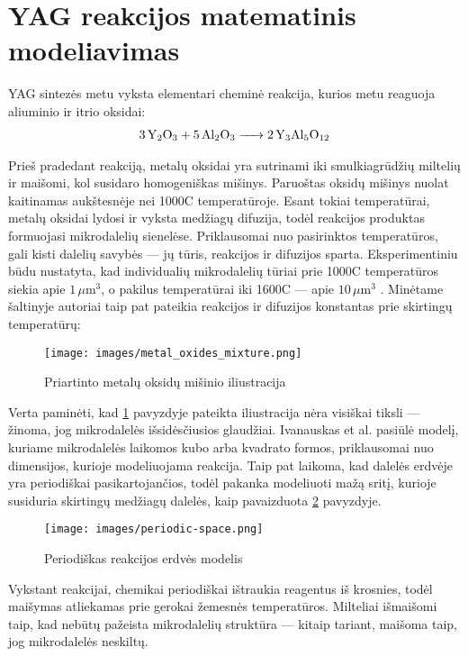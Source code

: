 \section{YAG reakcijos matematinis modeliavimas}

YAG sintezės metu vyksta elementari cheminė reakcija, kurios metu reaguoja aliuminio ir itrio oksidai:
\begin{align*}
  \ce{3Y_2O_3 + 5Al_2O_3 -> 2Y_3Al_5O_12}
\end{align*}

Prieš pradedant reakciją, metalų oksidai yra sutrinami iki smulkiagrūdžių miltelių ir maišomi, kol susidaro homogeniškas mišinys. Paruoštas oksidų mišinys nuolat kaitinamas aukštesnėje nei 1000\degree C temperatūroje. Esant tokiai temperatūrai, metalų oksidai lydosi ir vyksta medžiagų difuzija, todėl reakcijos produktas formuojasi mikrodalelių sienelėse. Priklausomai nuo pasirinktos temperatūros, gali kisti dalelių savybės — jų tūris, reakcijos ir difuzijos sparta. Eksperimentiniu būdu nustatyta, kad individualių mikrodalelių tūriai prie 1000\degree C temperatūros siekia apie $1\,\mu\text{m}^3$, o pakilus temperatūrai iki 1600\degree C — apie $10\,\mu\text{m}^3$ \cite{ivanauskasComputationalModellingYAG2009}. Minėtame šaltinyje autoriai taip pat pateikia reakcijos ir difuzijos konstantas prie skirtingų temperatūrų:

\begin{figure}[h]
  \centering
  \texttt{[image: images/metal\_oxides\_mixture.png]}
  \caption{Priartinto metalų oksidų mišinio iliustracija \cite{ivanauskasComputationalModellingYAG2009}}
  \label{fig:metal-oxides-mixuter}
\end{figure}

Verta paminėti, kad \ref{fig:metal-oxides-mixuter} pavyzdyje pateikta iliustracija nėra visiškai tiksli — žinoma, jog mikrodalelės išsidėsčiusios glaudžiai. Ivanauskas et al. \cite{ivanauskasModellingSolidState2005} pasiūlė modelį, kuriame mikrodalelės laikomos kubo arba kvadrato formos, priklausomai nuo dimensijos, kurioje modeliuojama reakcija. Taip pat laikoma, kad dalelės erdvėje yra periodiškai pasikartojančios, todėl pakanka modeliuoti mažą sritį, kurioje susiduria skirtingų medžiagų dalelės, kaip pavaizduota \ref{fig:periodic-space} pavyzdyje.

\begin{figure}[h]
  \centering
  \texttt{[image: images/periodic-space.png]}
  \caption{Periodiškas reakcijos erdvės modelis}
  \label{fig:periodic-space}
\end{figure}

Vykstant reakcijai, chemikai periodiškai ištraukia reagentus iš krosnies, todėl maišymas atliekamas prie gerokai žemesnės temperatūros. Milteliai išmaišomi taip, kad nebūtų pažeista mikrodalelių struktūra — kitaip tariant, maišoma taip, jog mikrodalelės neskiltų.